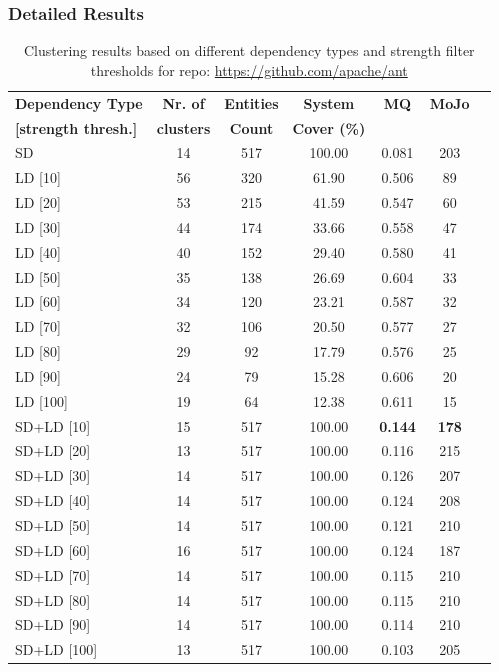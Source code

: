 \documentclass{ieeeaccess}
\begin{document}
\subsubsection{Detailed Results}

\begin{table}
\caption{Clustering results based on different dependency types and strength filter thresholds for repo: \url{https://github.com/apache/ant}}
\label{tab:clustering_results_ant}
\centering
\setlength{\tabcolsep}{3pt}
\begin{tabular}{|l|c|c|c|c|c|c|}
\hline
\textbf{Dependency Type} & \textbf{Nr. of} & \textbf{Entities} & \textbf{System} & \textbf{MQ} & \textbf{MoJo} \\
\textbf{[strength thresh.]} & \textbf{clusters} & \textbf{Count} & \textbf{Cover (\%)} &  &  \\
\hline
SD & 14 & 517 & 100.00 & 0.081 & 203 \\
\hline
LD [10] & 56 & 320 & 61.90 & 0.506 & 89 \\
LD [20] & 53 & 215 & 41.59 & 0.547 & 60 \\
LD [30] & 44 & 174 & 33.66 & 0.558 & 47 \\
LD [40] & 40 & 152 & 29.40 & 0.580 & 41 \\
LD [50] & 35 & 138 & 26.69 & 0.604 & 33 \\
LD [60] & 34 & 120 & 23.21 & 0.587 & 32 \\
LD [70] & 32 & 106 & 20.50 & 0.577 & 27 \\
LD [80] & 29 & 92 & 17.79 & 0.576 & 25 \\
LD [90] & 24 & 79 & 15.28 & 0.606 & 20 \\
LD [100] & 19 & 64 & 12.38 & 0.611 & 15 \\
\hline
SD+LD [10] & 15 & 517 & 100.00 & \cellcolor[HTML]{C0C0C0}\textbf{0.144} & \cellcolor[HTML]{C0C0C0}\textbf{178} \\
SD+LD [20] & 13 & 517 & 100.00 & 0.116 & 215 \\
SD+LD [30] & 14 & 517 & 100.00 & 0.126 & 207 \\
SD+LD [40] & 14 & 517 & 100.00 & 0.124 & 208 \\
SD+LD [50] & 14 & 517 & 100.00 & 0.121 & 210 \\
SD+LD [60] & 16 & 517 & 100.00 & 0.124 & 187 \\
SD+LD [70] & 14 & 517 & 100.00 & 0.115 & 210 \\
SD+LD [80] & 14 & 517 & 100.00 & 0.115 & 210 \\
SD+LD [90] & 14 & 517 & 100.00 & 0.114 & 210 \\
SD+LD [100] & 13 & 517 & 100.00 & 0.103 & 205 \\
\hline
\end{tabular}
\end{table}
\end{document}
